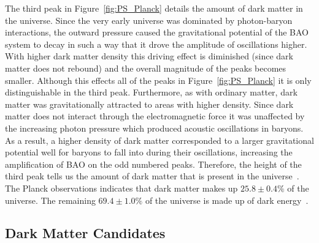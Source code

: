 The third peak in Figure~\ref{fig:PS_Planck} details the amount of dark matter in the universe.  Since the very early universe was dominated by photon-baryon interactions, the outward pressure caused the gravitational potential of the BAO system to decay in such a way that it drove the amplitude of oscillations higher.  With higher dark matter density this driving effect is diminished (since dark matter does not rebound) and the overall magnitude of the peaks becomes smaller.  Although this effects all of the peaks in Figure~\ref{fig:PS_Planck} it is only distinguishable in the third peak.  Furthermore, as with ordinary matter, dark matter was gravitationally attracted to areas with higher density.  Since dark matter does not interact through the electromagnetic force it was unaffected by the increasing photon pressure which produced acoustic oscillations in baryons.  As a result, a higher density of dark matter corresponded to a larger gravitational potential well for baryons to fall into during their oscillations, increasing the amplification of BAO on the odd numbered peaks.  Therefore, the height of the third peak tells us the amount of dark matter that is present in the universe~\cite{Whu}. The Planck observations indicates that dark matter makes up $25.8 \pm 0.4\%$ of the universe.  The remaining $69.4 \pm 1.0\%$ of the universe is made up of dark energy~\cite{Planck}.


\subsection{Dark Matter Candidates}

